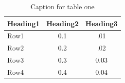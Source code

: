 \begin{table}[H]
  \centering
  \caption{Caption for table one}
  \label{tab:table1}
  \begin{tabular}{@{}lcc@{}}
    \toprule
    \textbf{Heading1} & \textbf{Heading2} & \textbf{Heading3} \\ \midrule
    Row1 & 0.1 & .01 \\
    Row2 & 0.2 & .02 \\
    Row3 & 0.3 & 0.03 \\
    Row4 & 0.4 & 0.04 \\ \bottomrule
  \end{tabular}
\end{table}